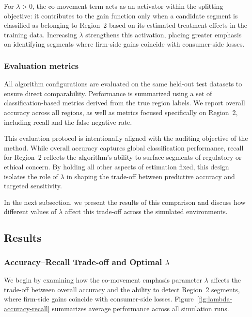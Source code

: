 \documentclass[11pt,letterpaper,english]{article}
\theoremstyle{definition}
\theoremstyle{definition}
\begin{document}
\begin{bibunit}
For $\lambda > 0$, the co-movement term acts as an activator within the splitting objective: it contributes to the gain function only when a candidate segment is classified as belonging to Region~2 based on its estimated treatment effects in the training data. Increasing $\lambda$ strengthens this activation, placing greater emphasis on identifying segments where firm-side gains coincide with consumer-side losses.

\subsubsection{Evaluation metrics}

All algorithm configurations are evaluated on the same held-out test datasets to ensure direct comparability. Performance is summarized using a set of classification-based metrics derived from the true region labels. We report overall accuracy across all regions, as well as metrics focused specifically on Region~2, including recall and the false negative rate.

This evaluation protocol is intentionally aligned with the auditing objective of the method. While overall accuracy captures global classification performance, recall for Region~2 reflects the algorithm’s ability to surface segments of regulatory or ethical concern. By holding all other aspects of estimation fixed, this design isolates the role of $\lambda$ in shaping the trade-off between predictive accuracy and targeted sensitivity.

In the next subsection, we present the results of this comparison and discuss how different values of $\lambda$ affect this trade-off across the simulated environments.

\subsection{Results}
\label{sec:lambda-results}

\subsubsection{Accuracy--Recall Trade-off and Optimal $\lambda$}

We begin by examining how the co-movement emphasis parameter $\lambda$ affects the trade-off between overall accuracy and the ability to detect Region~2 segments, where firm-side gains coincide with consumer-side losses. Figure~\ref{fig:lambda-accuracy-recall} summarizes average performance across all simulation runs.


\end{bibunit}
\end{document}
